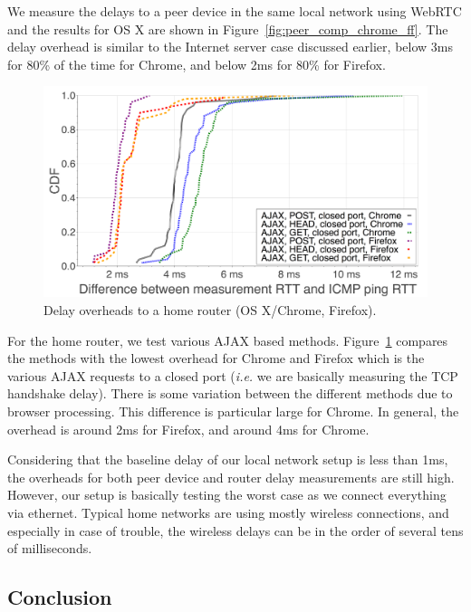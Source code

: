 \documentclass{sig-alternate-10pt}
\begin{document}
We measure the delays to a peer device in the same local network using WebRTC and the results for OS X are shown in Figure~\ref{fig:peer_comp_chrome_ff}. The delay overhead is similar to the Internet server case discussed earlier, below 3ms for 80\% of the time for Chrome, and below 2ms for 80\% for Firefox. 

\begin{figure}[thb]
\includegraphics[width=\columnwidth]{figures/router-comp-chrome-ff}
\caption{Delay overheads to a home router (OS X/Chrome, Firefox).}
\label{fig:router_comp_chrome_ff}
\end{figure}

For the home router, we test various AJAX based methods. Figure~\ref{fig:router_comp_chrome_ff} compares the methods with the lowest overhead for Chrome and Firefox which is the various AJAX requests to a closed port (\emph{i.e.} we are basically measuring the TCP handshake delay). There is some variation between the different methods due to browser processing. This difference is particular large for Chrome. In general, the overhead is around 2ms for Firefox, and around 4ms for Chrome. 

Considering that the baseline delay of our local network setup is less than 1ms, the overheads for both peer device and router delay measurements are still high. However, our setup is basically testing the worst case as we connect everything via ethernet. Typical home networks are using mostly wireless connections, and especially in case of trouble, the wireless delays can be in the order of several tens of milliseconds.

\subsection{Conclusion}
\end{document}
